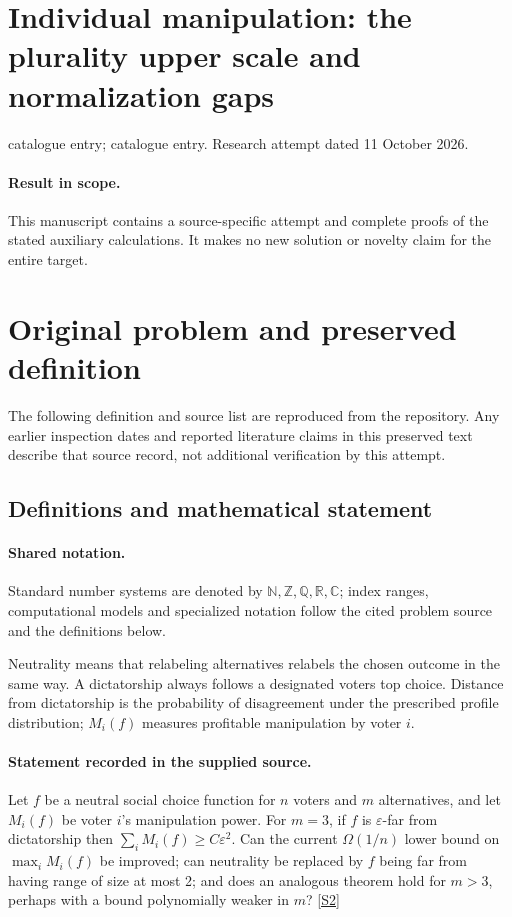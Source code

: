 \documentclass[11pt]{article}
\begin{document}
\section*{Individual manipulation: the plurality upper scale and normalization gaps}
\noindent catalogue entry; catalogue entry. Research attempt dated 11 October 2026.
\paragraph{Result in scope.}This manuscript contains a source-specific attempt and complete proofs of the stated auxiliary calculations. It makes no new solution or novelty claim for the entire target.
\section{Original problem and preserved definition}
The following definition and source list are reproduced from the repository. Any earlier inspection dates and reported literature claims in this preserved text describe that source record, not additional verification by this attempt.
\subsection{Definitions and mathematical statement}

\paragraph{Shared notation.}Standard number systems are denoted by $\mathbb N,\mathbb Z,\mathbb Q,\mathbb R,\mathbb C$; index ranges, computational models and specialized notation follow the cited problem source and the definitions below.


Neutrality means that relabeling alternatives relabels the chosen outcome in the same way. A dictatorship always follows a designated voter\textquotesingle s top choice. Distance from dictatorship is the probability of disagreement under the prescribed profile distribution; $M_i(f)$ measures profitable manipulation by voter $i$.
\paragraph{Statement recorded in the supplied source.}
Let $f$ be a neutral social choice function for $n$ voters and $m$ alternatives, and let $M_i(f)$ be voter $i$'s manipulation power. For $m=3$, if $f$ is $\varepsilon$-far from dictatorship then $\sum_iM_i(f)\geq C\varepsilon^2$. Can the current $\Omega(1/n)$ lower bound on $\max_iM_i(f)$ be improved; can neutrality be replaced by $f$ being far from having range of size at most 2; and does an analogous theorem hold for $m>3$, perhaps with a bound polynomially weaker in $m$? \href{https://doi.org/10.4171/owr/2008/01}{[S2]}
\end{document}
